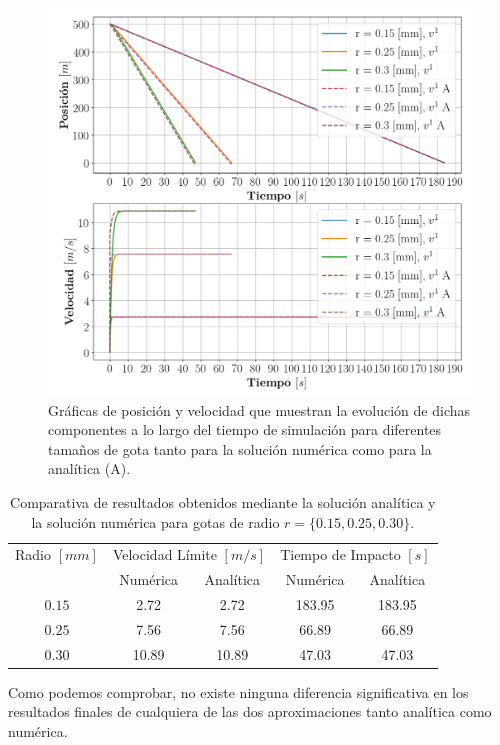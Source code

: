\documentclass[journal]{IEEEtran}
\begin{document}
\begin{figure}[!htb]
	\centering
	\includegraphics[width=\linewidth]{graficas_analitica}
  \caption{Gráficas de posición y velocidad que muestran la evolución de dichas componentes a lo largo del tiempo de simulación para diferentes tamaños de gota tanto para la solución numérica como para la analítica (A).}
  \label{fig:analitica}
\end{figure}

\begin{table}[!htb]
  \centering
	\begin{tabular}{ccccc}
    Radio $[mm]$ & \multicolumn{2}{c}{Velocidad Límite $[m/s]$} & \multicolumn{2}{c}{Tiempo de Impacto $[s]$}\\
    & Numérica & Analítica & Numérica & Analítica\\
		\hline
    $0.15$ & 2.72 & 2.72 & 183.95 & 183.95 \\
    $0.25$ & 7.56 & 7.56 & 66.89 & 66.89 \\
    $0.30$ & 10.89 & 10.89 & 47.03 & 47.03 \\
	\end{tabular}
  \caption{Comparativa de resultados obtenidos mediante la solución analítica y la solución numérica para gotas de radio $r=\{0.15, 0.25, 0.30\}$.}
  \label{table:analitica}
\end{table}

Como podemos comprobar, no existe ninguna diferencia significativa en los resultados finales de cualquiera de las dos aproximaciones tanto analítica como numérica.
\end{document}
